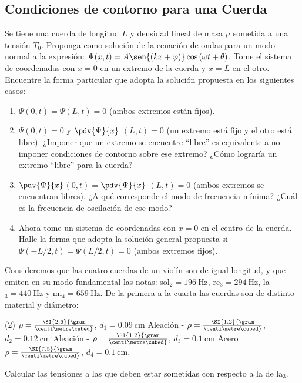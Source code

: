 \subsection*{Condiciones de contorno para una Cuerda}

\item Se tiene una cuerda de longitud $L$ y densidad lineal de masa $\mu$ sometida a una tensión $T_{0}$.
Proponga como solución de la ecuación de ondas para un modo normal a la expresión: $\Psi(x,t)= A \sen{ \left(k x+ \varphi \right ) } \cos{ \left( \omega t + \theta \right) }$.
Tome el sistema de coordenadas con $x=0$ en un extremo de la cuerda y $x=L$ en el otro.
Encuentre la forma particular que adopta la solución propuesta en los siguientes casos: 
\begin{enumerate}
	\item $\Psi(0,t) = \Psi(L,t) = 0$ (ambos extremos están fijos). 
	\item $\Psi(0,t) = 0$ y $\pdv{\Psi}{x}$ $(L,t)= 0$ (un extremo está fijo y el otro está libre).
	¿Imponer que un extremo se encuentre ``libre'' es equivalente a no imponer condiciones de contorno sobre ese extremo?
	¿Cómo lograría un extremo ``libre'' para la cuerda? 
	\item $\pdv{\Psi}{x}$$(0,t)=$$ \pdv{\Psi}{x}$ $(L,t)= 0$ (ambos extremos se encuentran libres).
	¿A qué corresponde el modo de frecuencia mínima?
	¿Cuál es la frecuencia de oscilación de ese modo? 
	\item Ahora tome un sistema de coordenadas con $x=0$ en el centro de la cuerda.
	Halle la forma que adopta la solución general propuesta si $\Psi(-L/2,t)= \Psi(L/2,t)= 0$ (ambos extremos fijos).
\end{enumerate}



\item Consideremos que las cuatro cuerdas de un violín son de igual longitud, y que emiten en su modo fundamental las notas: sol$_\text{2}= \SI{196}{\hertz}$, re$_\text{3}= \SI{294}{\hertz}$, la$_\text{3}= \SI{440}{\hertz}$ y mi$_\text{4}= \SI{659}{\hertz}$.
De la primera a la cuarta las cuerdas son de distinto material y diámetro:
\begin{tasks}[style=enumerate](2)
	\task {} \(\rho= \SI{2.6}{\gram\over\centi\metre\cubed}\), \(d_1= \SI{0,09}{\centi\metre}\)
	\task Aleación - $\rho = \SI{1.2}{\gram\over\centi\metre\cubed}$, $d_2 = \SI{0.12}{\centi\metre}$
	\task Aleación - $\rho = \SI{1.2}{\gram\over\centi\metre\cubed}$, $d_3 = \SI{0.1}{\centi\metre}$
	\task Acero $\rho = \SI{7.5}{\gram\over\centi\metre\cubed}$, $d_4 = \SI{0.1}{\centi\metre}$.
\end{tasks}
Calcular las tensiones a las que deben estar sometidas con respecto a la de la$_\text{3}$.



